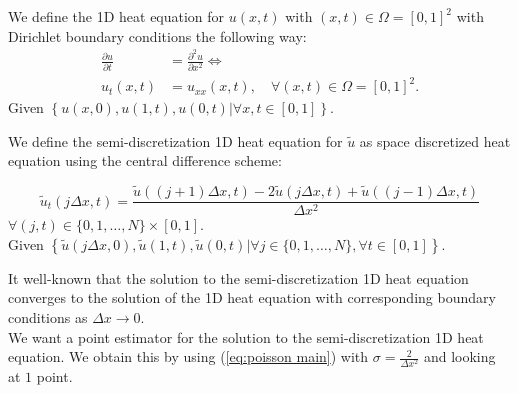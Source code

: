\documentclass[a4paper,12pt]{article}
\begin{document}

\begin{definition} \label{def:heat equation square}
    We define the 1D heat equation for $u(x,t)$ with $ (x,t) \in \Omega = [0,1]^2$
    with Dirichlet boundary conditions the following way:
    \begin{align}
        \frac{\partial u}{\partial t} & = \frac{\partial^{2} u}{\partial x^{2}}  \Leftrightarrow   \\
        u_t(x,t)                      & = u_{xx}(x,t), \quad \forall (x,t) \in \Omega = [0,1]^2  .
    \end{align}
    Given $\left\{u(x,0),u(1,t),u(0,t) | \forall x,t \in [0,1]  \right\} $.
\end{definition}

\begin{definition} \label{def:discrete heat equation square}
    We define the semi-discretization 1D heat equation for $\tilde{u}$ as space discretized heat equation
    using the central difference scheme:

    \begin{equation}
        \tilde{u}_t(j \Delta x,t)  = \frac{\tilde{u}((j+1) \Delta x, t)-2\tilde{u}(j \Delta x, t)+\tilde{u}((j-1) \Delta x, t)}{\Delta x^{2}}
    \end{equation}
    $\forall (j,t) \in \{0, 1, \ldots, N\} \times [0,1]$. \\
    Given $\left\{\tilde{u}(j \Delta x,0),\tilde{u}(1,t),\tilde{u}(0,t) | \forall j \in \{0, 1, \ldots, N\}, \forall t \in  [0,1]  \right\} $.
\end{definition}


It well-known that the solution to the semi-discretization 1D heat equation converges to the solution of the 1D heat equation with
corresponding boundary conditions as $\Delta x \rightarrow 0$. \\
We want a point estimator for the solution to the semi-discretization 1D heat equation. We obtain this by
using (\ref{eq:poisson main}) with $\sigma = \frac{2}{\Delta x^{2}}$ and looking at $1$ point.

\end{document}
